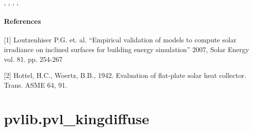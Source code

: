 \documentclass[letterpaper,10pt,english]{sphinxmanual}
\begin{document}
\begin{fulllineitems}
\begin{quote}
\begin{description}
\end{description}\end{quote}




{\hyperref[stubs/pvlib.pvl_reindl1990:pvlib.pvl_reindl1990]{}}, {\hyperref[stubs/pvlib.pvl_haydavies1980:pvlib.pvl_haydavies1980]{}}, {\hyperref[stubs/pvlib.pvl_perez:pvlib.pvl_perez]{}}, {\hyperref[stubs/pvlib.pvl_klucher1979:pvlib.pvl_klucher1979]{}}, {\hyperref[stubs/pvlib.pvl_kingdiffuse:pvlib.pvl_kingdiffuse]{}}


\paragraph{References}

{[}1{]} Loutzenhiser P.G. et. al. ``Empirical validation of models to compute
solar irradiance on inclined surfaces for building energy simulation''
2007, Solar Energy vol. 81. pp. 254-267

{[}2{]} Hottel, H.C., Woertz, B.B., 1942. Evaluation of flat-plate solar heat
collector. Trans. ASME 64, 91.

\end{fulllineitems}



\section{pvlib.pvl\_kingdiffuse}
\label{stubs/pvlib.pvl_kingdiffuse::doc}\label{stubs/pvlib.pvl_kingdiffuse:pvlib-pvl-kingdiffuse}
\end{document}
